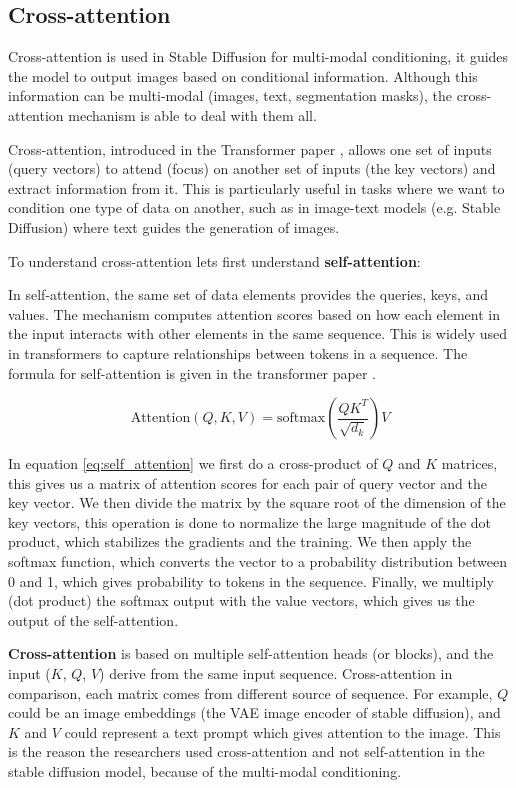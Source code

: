 \subsection{Cross-attention}

Cross-attention is used in Stable Diffusion for multi-modal conditioning, it guides the model to output images based on conditional information. Although this information can be multi-modal (images, text, segmentation masks), the cross-attention mechanism is able to deal with them all.

Cross-attention, introduced in the Transformer paper \cite{transformer}, allows one set of inputs (query vectors) to attend (focus) on another set of inputs (the key vectors) and extract information from it. This is particularly useful in tasks where we want to condition one type of data on another, such as in image-text models (e.g. Stable Diffusion) where text guides the generation of images.

To understand cross-attention lets first understand \textbf{self-attention}:

In self-attention, the same set of data elements provides the queries, keys, and values. The mechanism computes attention scores based on how each element in the input interacts with other elements in the same sequence. This is widely used in transformers to capture relationships between tokens in a sequence. The formula for self-attention is given in the transformer paper \cite{transformer}.

\begin{equation}
    \text{Attention}(Q, K, V) = \text{softmax} \left( \frac{QK^T}{\sqrt{d_k}} \right) V
    \label{eq:self_attention}
\end{equation}

In equation \ref{eq:self_attention} we first do a cross-product of $Q$ and $K$ matrices, this gives us a matrix of attention scores for each pair of query vector and the key vector. We then divide the matrix by the square root of the dimension of the key vectors, this operation is done to normalize the large magnitude of the dot product, which stabilizes the gradients and the training. We then apply the softmax function, which converts the vector to a probability distribution between 0 and 1, which gives probability to tokens in the sequence. Finally, we multiply (dot product) the softmax output with the value vectors, which gives us the output of the self-attention.

\textbf{Cross-attention} is based on multiple self-attention heads (or blocks), and the input ($K$, $Q$, $V$) derive from the same input sequence. Cross-attention in comparison, each matrix comes from different source of sequence. For example, $Q$ could be an image embeddings (the VAE image encoder of stable diffusion), and $K$ and $V$ could represent a text prompt which gives attention to the image. This is the reason the researchers used cross-attention and not self-attention in the stable diffusion model, because of the multi-modal conditioning.

